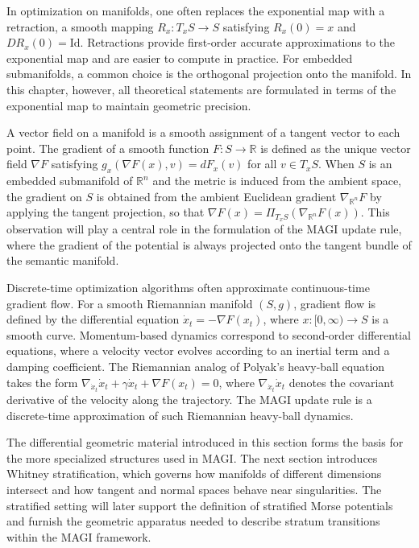 \documentclass[12pt]{article}
\begin{document}
In optimization on manifolds, one often replaces the exponential map with a retraction, a smooth mapping $R_x : T_x S \to S$ satisfying $R_x(0) = x$ and $DR_x(0) = \mathrm{Id}$. Retractions provide first-order accurate approximations to the exponential map and are easier to compute in practice. For embedded submanifolds, a common choice is the orthogonal projection onto the manifold. In this chapter, however, all theoretical statements are formulated in terms of the exponential map to maintain geometric precision.

A vector field on a manifold is a smooth assignment of a tangent vector to each point. The gradient of a smooth function $F : S \to \mathbb{R}$ is defined as the unique vector field $\nabla F$ satisfying $g_x(\nabla F(x), v) = dF_x(v)$ for all $v \in T_x S$. When $S$ is an embedded submanifold of $\mathbb{R}^n$ and the metric is induced from the ambient space, the gradient on $S$ is obtained from the ambient Euclidean gradient $\nabla_{\mathbb{R}^n} F$ by applying the tangent projection, so that $\nabla F(x) = \Pi_{T_x S}(\nabla_{\mathbb{R}^n} F(x))$. This observation will play a central role in the formulation of the MAGI update rule, where the gradient of the potential is always projected onto the tangent bundle of the semantic manifold.

Discrete-time optimization algorithms often approximate continuous-time gradient flow. For a smooth Riemannian manifold $(S, g)$, gradient flow is defined by the differential equation $\dot{x}_t = -\nabla F(x_t)$, where $x : [0, \infty) \to S$ is a smooth curve. Momentum-based dynamics correspond to second-order differential equations, where a velocity vector evolves according to an inertial term and a damping coefficient. The Riemannian analog of Polyak's heavy-ball equation takes the form $\nabla_{\dot{x}_t} \dot{x}_t + \gamma \dot{x}_t + \nabla F(x_t) = 0$, where $\nabla_{\dot{x}_t} \dot{x}_t$ denotes the covariant derivative of the velocity along the trajectory. The MAGI update rule is a discrete-time approximation of such Riemannian heavy-ball dynamics.

The differential geometric material introduced in this section forms the basis for the more specialized structures used in MAGI. The next section introduces Whitney stratification, which governs how manifolds of different dimensions intersect and how tangent and normal spaces behave near singularities. The stratified setting will later support the definition of stratified Morse potentials and furnish the geometric apparatus needed to describe stratum transitions within the MAGI framework.
\end{document}
